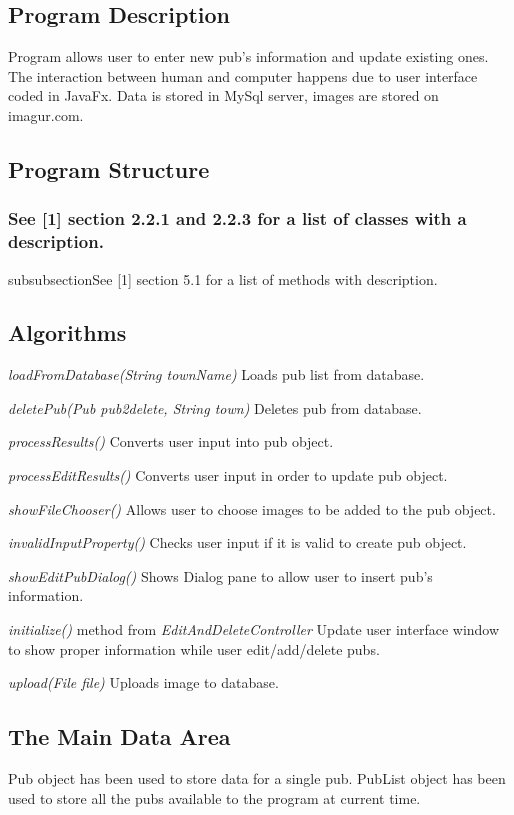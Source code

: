 \documentclass{project}
\begin{document}
\subsection{Program Description}
Program allows user to enter new pub’s information and update existing ones. The interaction between human and computer happens due to user interface coded in JavaFx. Data is stored in MySql server, images are stored on imagur.com. 

\subsection{Program Structure}
\subsubsection{See [1] section 2.2.1 and 2.2.3 for a list of classes with a description.}
subsubsection{See [1] section 5.1 for a list of methods with description.}

\subsection{Algorithms}
\textit{loadFromDatabase(String townName)} Loads pub list from database.\par
\textit{deletePub(Pub pub2delete, String town)} Deletes pub from database.\par
\textit{processResults()} Converts user input into pub object.\par
\textit{processEditResults()} Converts user input in order to update pub object.\par
\textit{showFileChooser()} Allows user to choose images to be added to the pub object.\par
\textit{invalidInputProperty()} Checks user input if it is valid to create pub object.\par
\textit{showEditPubDialog()} Shows Dialog pane to allow user to insert pub’s information.\par
\textit{initialize()} method from \textit{EditAndDeleteController} Update user interface window to show proper information while user edit/add/delete pubs.\par
\textit{upload(File file)} Uploads image to database.\par


\subsection{The Main Data Area}
Pub object has been used to store data for a single pub. PubList object has been used to store all the pubs available to the program at current time. 
\end{document}
